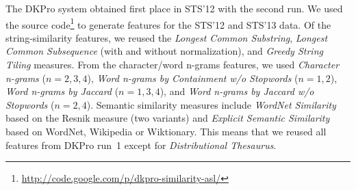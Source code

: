 
The DKPro system \citep{bar2012ukp} obtained first place in STS'12 with the second run. 
We used the source code\footnote{\url{http://code.google.com/p/dkpro-similarity-asl/}} 
to generate features for the STS'12 and STS'13 data. 
Of the string-similarity features, we reused the
\emph{Longest Common Substring}, 
\emph{Longest Common Subsequence} (with and without normalization), and
\emph{Greedy String Tiling\/} measures. 
From the character/word n-grams features, we used 
\emph{Character n-grams} ($n=2,3,4$), 
\emph{Word n-grams by Containment w/o Stopwords} ($n=1,2$),  
\emph{Word n-grams by Jaccard} ($n=1,3,4$), and  
\emph{Word n-grams by Jaccard w/o Stopwords} ($n=2,4$). 
Semantic similarity measures include 
\emph{WordNet Similarity\/} based on the Resnik measure (two variants) and 
\emph{Explicit Semantic Similarity\/} based on WordNet, Wikipedia or Wiktionary. 
This means that we reused all features from DKPro run~1 
except for \emph{Distributional Thesaurus}.
